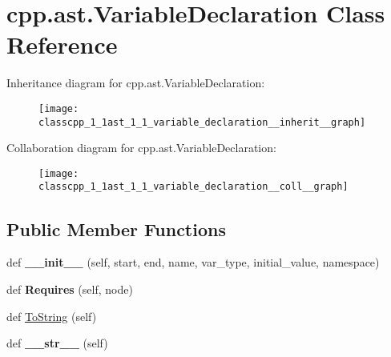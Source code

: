 \hypertarget{classcpp_1_1ast_1_1_variable_declaration}{}\section{cpp.\+ast.\+Variable\+Declaration Class Reference}
\label{classcpp_1_1ast_1_1_variable_declaration}


Inheritance diagram for cpp.\+ast.\+Variable\+Declaration\+:
\nopagebreak
\begin{figure}[H]
\begin{center}
\leavevmode
\texttt{[image: classcpp\_1\_1ast\_1\_1\_variable\_declaration\_\_inherit\_\_graph]}
\end{center}
\end{figure}


Collaboration diagram for cpp.\+ast.\+Variable\+Declaration\+:
\nopagebreak
\begin{figure}[H]
\begin{center}
\leavevmode
\texttt{[image: classcpp\_1\_1ast\_1\_1\_variable\_declaration\_\_coll\_\_graph]}
\end{center}
\end{figure}
\subsection*{Public Member Functions}
\begin{DoxyCompactItemize}
\item 
\mbox{\label{classcpp_1_1ast_1_1_variable_declaration_adc19909b6a3b2c2978b02044634fc13f}} 
def {\bfseries \+\_\+\+\_\+init\+\_\+\+\_\+} (self, start, end, name, var\+\_\+type, initial\+\_\+value, namespace)
\item 
\mbox{\label{classcpp_1_1ast_1_1_variable_declaration_aaa1cae7cf191e6d561d861cd053a0bf4}} 
def {\bfseries Requires} (self, node)
\item 
def \hyperlink{classcpp_1_1ast_1_1_variable_declaration_a047aa4afddf7b7823a4095cea9477a21}{To\+String} (self)
\item 
\mbox{\label{classcpp_1_1ast_1_1_variable_declaration_a9f5c15731d1bdd8fe14c2a575e2f4fe6}} 
def {\bfseries \+\_\+\+\_\+str\+\_\+\+\_\+} (self)
\end{DoxyCompactItemize}
